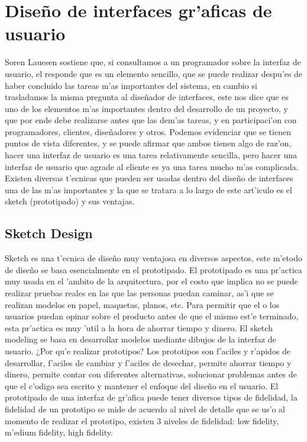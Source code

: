 \section{Dise\~no de interfaces gr'aficas de usuario}
Soren Lauesen \cite{lauesen2005user} sostiene que, si consultamos a un programador sobre la interfaz de usuario, el responde que es un elemento sencillo, que se puede realizar despu'es de haber concluido las tareas m'as importantes del sistema, en cambio si trasladamos la misma pregunta al dise\~nador de interfaces, este nos dice que es uno de los elementos m'as importantes dentro del desarrollo de un proyecto, y que por ende debe realizarse antes que las dem'as tareas, y en participaci'on con programadores, clientes, dise\~nadores y otros.
Podemos evidenciar que se tienen puntos de vista diferentes, y se puede afirmar que ambos tienen algo de raz'on, hacer una interfaz de usuario es una tarea relativamente sencilla, pero hacer una interfaz de usuario que agrade al cliente es ya una tarea mucho m'as complicada.
Existen diversas t'ecnicas que pueden ser usadas dentro del dise\~no de interfaces una de las m'as importantes y la que se tratara a lo largo de este art'iculo es el sketch (prototipado) y sus ventajas.

\subsection{Sketch Design}

Sketch es una t'ecnica de dise\~no muy ventajosa en diversos aspectos, este m'etodo de dise\~no se basa esencialmente en el prototipado.
	El prototipado es una pr'actica muy usada en el 'ambito de la arquitectura, por el costo que implica no se puede realizar pruebas reales en las que las personas puedan caminar, as'i que se realizan modelos en papel, maquetas, planos, etc. Para permitir que el o los usuarios puedan opinar sobre el producto antes de que  el mismo est'e terminado, esta pr'actica es muy 'util a la hora de ahorrar tiempo y dinero. El sketch modeling se basa en desarrollar modelos mediante dibujos de la interfaz de usuario.
¿Por qu'e realizar prototipos?
Los prototipos son f'aciles y r'apidos de desarrollar, f'aciles de cambiar y f'aciles de desechar, permite ahorrar tiempo y dinero, permite contar con diferentes alternativas, solucionar problemas antes de que el c'odigo sea escrito y mantener el enfoque del dise\~no en el usuario.
El prototipado de una interfaz de gr'afica puede tener diversos tipos de fidelidad, la fidelidad de un prototipo se mide de acuerdo al nivel de detalle que se us'o al momento de realizar el prototipo, existen 3 niveles de fidelidad: low fidelity, m'edium fidelity, high fidelity. 

